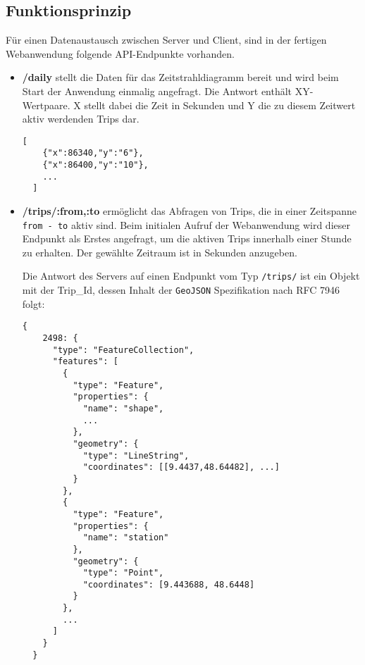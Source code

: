 \subsection{Funktionsprinzip}
\label{sub:funktionsprinzip}
    Für einen Datenaustausch zwischen Server und Client, sind in der fertigen Webanwendung folgende API\footnotemark-Endpunkte vorhanden. 


    \begin{itemize}
      \item \textbf{/daily} stellt die Daten für das Zeitstrahldiagramm bereit und wird beim Start der Anwendung einmalig angefragt. Die Antwort enthält XY-Wertpaare. X stellt dabei die Zeit in Sekunden und Y die zu diesem Zeitwert aktiv werdenden Trips dar.

  \begin{lstlisting}[captionpos=t, caption=Antwort des Servers zur Anfrage \texttt{/daily}, label=lst:daily_response]
  [
    {"x":86340,"y":"6"},
    {"x":86400,"y":"10"}, 
    ...
  ]
  \end{lstlisting}

      \item \textbf{/trips/:from,:to} ermöglicht das Abfragen von Trips, die in einer Zeitspanne \texttt{from - to} aktiv sind. Beim initialen Aufruf der Webanwendung wird dieser Endpunkt als Erstes angefragt, um die aktiven Trips innerhalb einer Stunde zu erhalten. Der gewählte Zeitraum ist in Sekunden anzugeben. 

      Die Antwort des Servers auf einen Endpunkt vom Typ \texttt{/trips/} ist ein Objekt mit der Trip\_Id, dessen Inhalt der \texttt{GeoJSON} Spezifikation nach RFC 7946 folgt:

  \begin{lstlisting}[captionpos=t, caption=Trip Objekt, label=lst:trip_object]
  {
    2498: {  
      "type": "FeatureCollection",
      "features": [
        {
          "type": "Feature",
          "properties": {
            "name": "shape",
            ...
          },
          "geometry": {
            "type": "LineString",
            "coordinates": [[9.4437,48.64482], ...]
          }
        },
        {
          "type": "Feature",
          "properties": {
            "name": "station"
          },
          "geometry": {
            "type": "Point",
            "coordinates": [9.443688, 48.6448]
          }
        },
        ...
      ]
    }
  }
  \end{lstlisting}
    

\end{itemize}
